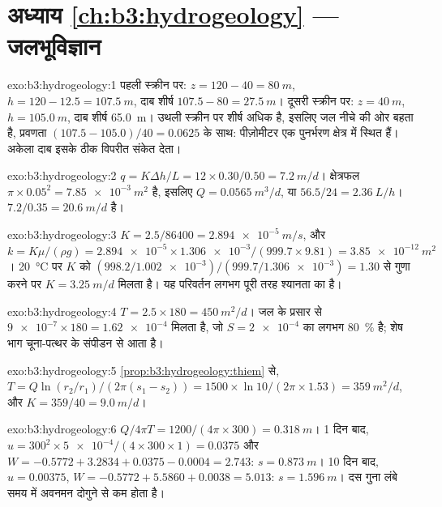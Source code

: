 \section*{अध्याय \ref{ch:b3:hydrogeology} --- जलभूविज्ञान}

\begin{solution}{exo:b3:hydrogeology:1}
पहली स्क्रीन पर: $z = 120 - 40 = \qty{80}{m}$, $h = 120 - 12.5 =
\qty{107.5}{m}$, दाब शीर्ष $107.5 - 80 = \qty{27.5}{m}$। दूसरी
स्क्रीन पर: $z = \qty{40}{m}$, $h = \qty{105.0}{m}$, दाब शीर्ष
\qty{65.0}{m}। उथली स्क्रीन पर शीर्ष अधिक है, इसलिए जल नीचे की ओर
बहता है, प्रवणता $(107.5 - 105.0)/40 = \num{0.0625}$ के साथ:
पीज़ोमीटर एक पुनर्भरण क्षेत्र में स्थित हैं। अकेला दाब इसके ठीक
विपरीत संकेत देता।
\end{solution}

\begin{solution}{exo:b3:hydrogeology:2}
$q = K\Delta h/L = 12\times0.30/0.50 = \qty{7.2}{m/d}$। क्षेत्रफल
$\pi\times0.05^2 = \qty{7.85e-3}{m^2}$ है, इसलिए $Q = \qty{0.0565}{m^3/d}$, या
$56.5/24 = \qty{2.36}{L/h}$।  $7.2/0.35 =
\qty{20.6}{m/d}$ है।
\end{solution}

\begin{solution}{exo:b3:hydrogeology:3}
$K = 2.5/86400 = \qty{2.894e-5}{m/s}$, और $k = K\mu/(\rho g) =
\num{2.894e-5}\times\num{1.306e-3}/(999.7\times9.81) =
\qty{3.85e-12}{m^2}$। \qty{20}{\celsius} पर $K$ को
$(998.2/\num{1.002e-3})/(999.7/\num{1.306e-3}) = \num{1.30}$ से गुणा करने पर $K =
\qty{3.25}{m/d}$ मिलता है। यह परिवर्तन लगभग पूरी तरह श्यानता का है।
\end{solution}

\begin{solution}{exo:b3:hydrogeology:4}
$T = 2.5\times180 = \qty{450}{m^2/d}$। जल के प्रसार से
$\num{9e-7}\times180 = \num{1.62e-4}$ मिलता है, जो $S =
\num{2e-4}$ का लगभग \qty{80}{\percent} है; शेष भाग चूना-पत्थर के संपीडन से आता है।
\end{solution}

\begin{solution}{exo:b3:hydrogeology:5}
\cref{prop:b3:hydrogeology:thiem} से, $T = Q\ln(r_2/r_1)/(2\pi(s_1 -
s_2)) = 1500\times\ln10/(2\pi\times1.53) = \qty{359}{m^2/d}$, और $K =
359/40 = \qty{9.0}{m/d}$।
\end{solution}

\begin{solution}{exo:b3:hydrogeology:6}
$Q/4\pi T = 1200/(4\pi\times300) = \qty{0.318}{m}$। 1 दिन बाद, $u =
300^2\times\num{5e-4}/(4\times300\times1) = \num{0.0375}$ और $W = -0.5772
+ 3.2834 + 0.0375 - 0.0004 = \num{2.743}$: $s = \qty{0.873}{m}$। 10
दिन बाद, $u = \num{0.00375}$, $W = -0.5772 + 5.5860 + 0.0038 = \num{5.013}$:
$s = \qty{1.596}{m}$। दस गुना लंबे समय में अवनमन दोगुने से कम
होता है।
\end{solution}


